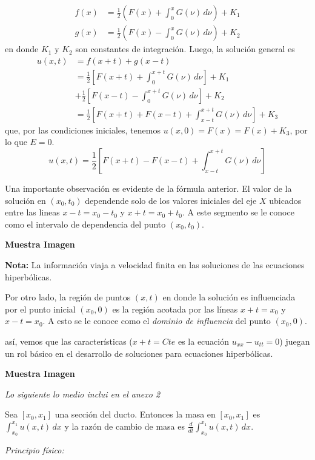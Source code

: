 \begin{align*}
f(x) &= \frac{1}{2} \left( F(x) + \int_0^x G(\nu) \,d\nu \right) + K_1 \\
g(x) &= \frac{1}{2} \left( F(x) - \int_0^x G(\nu) \,d\nu \right) + K_2 
\end{align*}
en donde $K_1$ y $K_2$ son constantes de integración. Luego, la solución general es
\begin{align*}
u(x,t) &= f(x+t) + g(x-t) \\
	   &= \frac{1}{2} \left[ F(x+t) + \int_0^{x+t} G(\nu) \,d\nu \right] + K_1 \\
	   &+ \frac{1}{2} \left[ F(x-t) - \int_0^{x+t} G(\nu) \,d\nu \right] + K_2 \\
	   &= \frac{1}{2} \left[ F(x+t) + F(x-t) + \int_{x-t}^{x+t} G(\nu) \,d\nu \right] + K_3
\end{align*}
que, por las condiciones iniciales, tenemos $u(x,0) = F(x) = F(x) + K_3$, por lo que $E=0$.
\[
u(x,t) = \frac{1}{2} \left[ F(x+t) - F(x-t) + \int_{x-t}^{x+t} G(\nu) \,d\nu \right]
\]

Una importante observación es evidente de la fórmula anterior. El valor de la solución en $(x_0,t_0)$ dependende solo de los valores iniciales del eje $X$ ubicados entre las lineas $x-t=x_0-t_0$ y $x+t=x_0+t_0$. A este segmento se le conoce como el intervalo de dependencia del punto $(x_0, t_0)$.

\textbf{Muestra Imagen}

\textbf{Nota:} La información viaja a velocidad finita en las soluciones de las ecuaciones hiperbólicas.

Por otro lado, la región de puntos $(x,t)$ en donde la solución es influenciada por el punto inicial $(x_0,0)$ es la región acotada por las líneas $x+t = x_0$ y $x-t=x_0$. A esto se le conoce como el \textit{dominio de influencia} del punto $(x_0, 0)$.

así, vemos que las características ($x+t = Cte$ es la ecuación $u_{xx} - u_{tt} = 0$) juegan un rol básico en el desarrollo de soluciones para ecuaciones hiperbólicas.

\textbf{Muestra Imagen}




\textit{Lo siguiente lo medio inclui en el anexo 2}

Sea $[x_0, x_1]$ una sección del ducto. Entonces la masa en $[x_0, x_1]$ es $\int_{x_0}^{x_1} u(x,t) \,dx$ y la razón de cambio de masa es $\frac{d}{dt} \int_{x_0}^{x_1} u(x,t) \,dx$.

\textit{Principio físico:}

